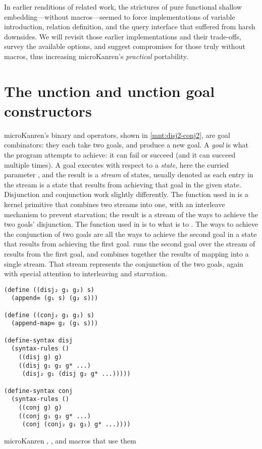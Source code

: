 \documentclass[sigplan,balance=true,pbalance=true,natbib=false]{acmart}
\begin{document}
In earlier renditions of related work, the strictures of pure
functional shallow embedding---without macros---seemed to force
implementations of variable introduction, relation definition, and the
query interface that suffered from harsh downsides. We will revisit
those earlier implementations and their trade-offs, survey the
available options, and suggest compromises for those
truly without macros, thus increasing microKanren's \emph{practical}
portability.

\section{The \textmd{}unction and \textmd{}unction
  goal constructors}\label{sec:conde}

microKanren's binary  and 
operators, shown in \cref{mnt:disj2-conj2}, are goal combinators: they
each take two goals, and produce a new goal. A \emph{goal} is what the
program attempts to achieve: it can fail or succeed (and it can
succeed multiple times). A goal executes with respect to a
\emph{state}, here the curried parameter , and the
result is a \emph{stream} of states, usually denoted 
as each entry in the stream is a state that results from achieving
that goal in the given state. Disjunction and conjunction work
slightly differently. The  function used in
 is a kernel primitive that combines two streams
into one, with an interleave mechanism to prevent starvation; the
result is a stream of the ways to achieve the two goals' disjunction.
The  function used in  is to
 what  is to
. The ways to achieve the conjunction of two goals
are all the ways to achieve the second goal in a state that results
from achieving the first goal.\@ {} runs the
second goal over the stream of results from the first goal, and
combines together the results of mapping into a single stream. That
stream represents the conjunction of the two goals, again with special
attention to interleaving and starvation.

\begin{listing}
  \begin{verbatim}
(define ((disj₂ g₁ g₂) s)
  (append∞ (g₁ s) (g₂ s)))

(define ((conj₂ g₁ g₂) s)
  (append-map∞ g₂ (g₁ s)))

(define-syntax disj
  (syntax-rules ()
    ((disj g) g)
    ((disj g₁ g₂ g* ...)
     (disj₂ g₁ (disj g₂ g* ...)))))

(define-syntax conj
  (syntax-rules ()
    ((conj g) g)
    ((conj g₁ g₂ g* ...)
     (conj (conj₂ g₁ g₂) g* ...))))
  \end{verbatim}
  \caption{microKanren , , and macros that use them}\label{mnt:disj2-conj2}
\end{listing}
\end{document}
